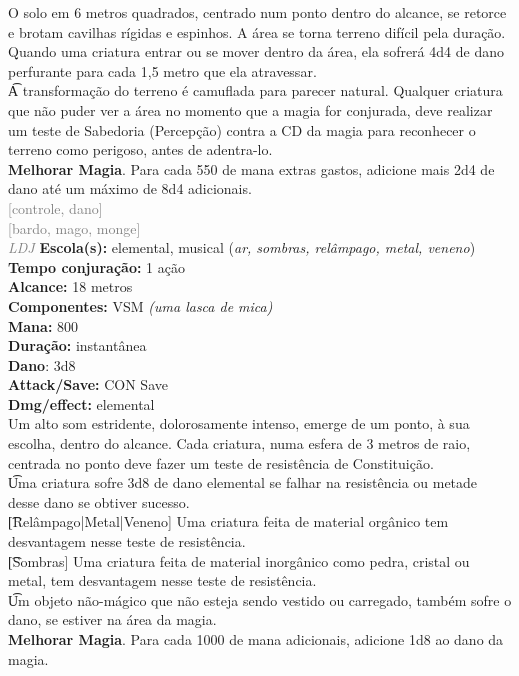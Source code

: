 \documentclass{RPG_Adventure}[2021/10/20]
\begin{document}
{\normalsize O solo em 6 metros quadrados, centrado num ponto dentro do alcance, se retorce e brotam cavilhas rígidas e espinhos. A área se torna terreno difícil pela duração. Quando uma criatura entrar ou se mover dentro da área, ela sofrerá 4d4 de dano perfurante para cada 1,5 metro que ela atravessar.\\\t A transformação do terreno é camuflada para parecer natural. Qualquer criatura que não puder ver a área no momento que a magia for conjurada, deve realizar um teste de Sabedoria (Percepção) contra a CD da magia para reconhecer o terreno como perigoso, antes de adentra-lo.\\\t \textbf{Melhorar Magia}. Para cada 550 de mana extras gastos, adicione mais 2d4 de dano até um máximo de 8d4 adicionais.\\}
{\scriptsize \textcolor{gray}{[controle, dano]\\}}
{\scriptsize \textcolor{gray}{[bardo, mago, monge]\\}}
{\tiny \textcolor{gray}{\textit{LDJ}}}
{\small \t \textbf{Escola(s):} elemental, musical (\textit{ar, sombras, relâmpago, metal, veneno})\\\t \textbf{Tempo conjuração:} 1 ação\\\t \textbf{Alcance:} 18 metros\\\t \textbf{Componentes:} VSM \textit{(uma lasca de mica)}\\\t \textbf{Mana:} 800\\\t \textbf{Duração:} instantânea\\\t \textbf{Dano}: 3d8\\\t \textbf{Attack/Save:} CON Save\\\t \textbf{Dmg/effect:} elemental\\}
{\normalsize Um alto som estridente, dolorosamente intenso, emerge de um ponto, à sua escolha, dentro do alcance. Cada criatura, numa esfera de 3 metros de raio, centrada no ponto deve fazer um teste de resistência de Constituição.\\\t Uma criatura sofre 3d8 de dano elemental se falhar na resistência ou metade desse dano se obtiver sucesso.\\\t [Relâmpago|Metal|Veneno] Uma criatura feita de material orgânico tem desvantagem nesse teste de resistência.\\\t [Sombras] Uma criatura feita de material inorgânico como pedra, cristal ou metal, tem desvantagem nesse teste de resistência.\\\t Um objeto não-mágico que não esteja sendo vestido ou carregado, também sofre o dano, se estiver na área da magia.\\\t \textbf{Melhorar Magia}. Para cada 1000 de mana adicionais, adicione 1d8 ao dano da magia.\\}
\end{document}
